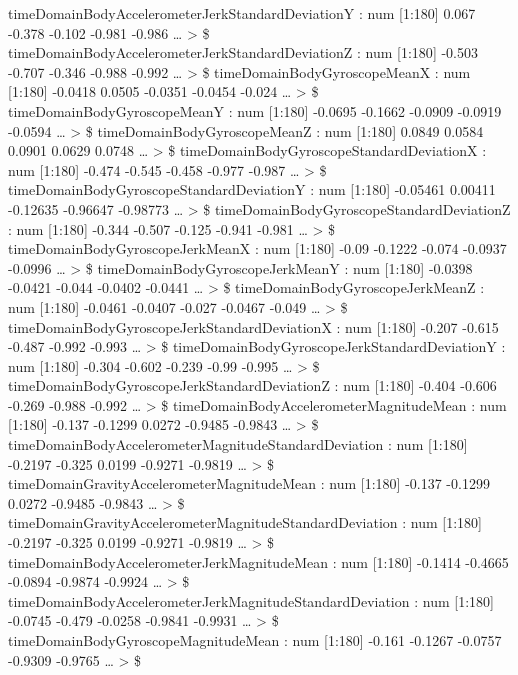 \documentclass[
]{article}
\begin{document}
timeDomainBodyAccelerometerJerkStandardDeviationY : num {[}1:180{]}
0.067 -0.378 -0.102 -0.981 -0.986 \ldots{} \textgreater{} \$
timeDomainBodyAccelerometerJerkStandardDeviationZ : num {[}1:180{]}
-0.503 -0.707 -0.346 -0.988 -0.992 \ldots{} \textgreater{} \$
timeDomainBodyGyroscopeMeanX : num {[}1:180{]} -0.0418 0.0505 -0.0351
-0.0454 -0.024 \ldots{} \textgreater{} \$ timeDomainBodyGyroscopeMeanY :
num {[}1:180{]} -0.0695 -0.1662 -0.0909 -0.0919 -0.0594 \ldots{}
\textgreater{} \$ timeDomainBodyGyroscopeMeanZ : num {[}1:180{]} 0.0849
0.0584 0.0901 0.0629 0.0748 \ldots{} \textgreater{} \$
timeDomainBodyGyroscopeStandardDeviationX : num {[}1:180{]} -0.474
-0.545 -0.458 -0.977 -0.987 \ldots{} \textgreater{} \$
timeDomainBodyGyroscopeStandardDeviationY : num {[}1:180{]} -0.05461
0.00411 -0.12635 -0.96647 -0.98773 \ldots{} \textgreater{} \$
timeDomainBodyGyroscopeStandardDeviationZ : num {[}1:180{]} -0.344
-0.507 -0.125 -0.941 -0.981 \ldots{} \textgreater{} \$
timeDomainBodyGyroscopeJerkMeanX : num {[}1:180{]} -0.09 -0.1222 -0.074
-0.0937 -0.0996 \ldots{} \textgreater{} \$
timeDomainBodyGyroscopeJerkMeanY : num {[}1:180{]} -0.0398 -0.0421
-0.044 -0.0402 -0.0441 \ldots{} \textgreater{} \$
timeDomainBodyGyroscopeJerkMeanZ : num {[}1:180{]} -0.0461 -0.0407
-0.027 -0.0467 -0.049 \ldots{} \textgreater{} \$
timeDomainBodyGyroscopeJerkStandardDeviationX : num {[}1:180{]} -0.207
-0.615 -0.487 -0.992 -0.993 \ldots{} \textgreater{} \$
timeDomainBodyGyroscopeJerkStandardDeviationY : num {[}1:180{]} -0.304
-0.602 -0.239 -0.99 -0.995 \ldots{} \textgreater{} \$
timeDomainBodyGyroscopeJerkStandardDeviationZ : num {[}1:180{]} -0.404
-0.606 -0.269 -0.988 -0.992 \ldots{} \textgreater{} \$
timeDomainBodyAccelerometerMagnitudeMean : num {[}1:180{]} -0.137
-0.1299 0.0272 -0.9485 -0.9843 \ldots{} \textgreater{} \$
timeDomainBodyAccelerometerMagnitudeStandardDeviation : num {[}1:180{]}
-0.2197 -0.325 0.0199 -0.9271 -0.9819 \ldots{} \textgreater{} \$
timeDomainGravityAccelerometerMagnitudeMean : num {[}1:180{]} -0.137
-0.1299 0.0272 -0.9485 -0.9843 \ldots{} \textgreater{} \$
timeDomainGravityAccelerometerMagnitudeStandardDeviation : num
{[}1:180{]} -0.2197 -0.325 0.0199 -0.9271 -0.9819 \ldots{}
\textgreater{} \$ timeDomainBodyAccelerometerJerkMagnitudeMean : num
{[}1:180{]} -0.1414 -0.4665 -0.0894 -0.9874 -0.9924 \ldots{}
\textgreater{} \$
timeDomainBodyAccelerometerJerkMagnitudeStandardDeviation : num
{[}1:180{]} -0.0745 -0.479 -0.0258 -0.9841 -0.9931 \ldots{}
\textgreater{} \$ timeDomainBodyGyroscopeMagnitudeMean : num {[}1:180{]}
-0.161 -0.1267 -0.0757 -0.9309 -0.9765 \ldots{} \textgreater{} \$
\end{document}
